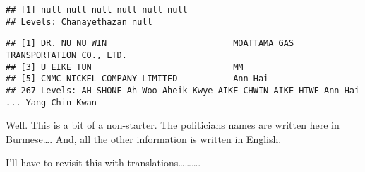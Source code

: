 \documentclass[
]{article}
\newenvironment{Shaded}{\begin{snugshade}}{\end{snugshade}}
\newcommand{\DecValTok}[1]{\textcolor[rgb]{0.00,0.00,0.81}{#1}}
\newcommand{\FunctionTok}[1]{\textcolor[rgb]{0.00,0.00,0.00}{#1}}
\newcommand{\NormalTok}[1]{#1}
\newcommand{\SpecialCharTok}[1]{\textcolor[rgb]{0.00,0.00,0.00}{#1}}
\begin{document}
\begin{Shaded}
\end{Shaded}

\begin{verbatim}
## [1] null null null null null null
## Levels: Chanayethazan null
\end{verbatim}

\begin{Shaded}
\end{Shaded}

\begin{verbatim}
## [1] DR. NU NU WIN                         MOATTAMA GAS TRANSPORTATION CO., LTD.
## [3] U EIKE TUN                            MM                                   
## [5] CNMC NICKEL COMPANY LIMITED           Ann Hai                              
## 267 Levels: AH SHONE Ah Woo Aheik Kwye AIKE CHWIN AIKE HTWE Ann Hai ... Yang Chin Kwan
\end{verbatim}

Well. This is a bit of a non-starter. The politicians names are written
here in Burmese\ldots. And, all the other information is written in
English.

I'll have to revisit this with translations\ldots\ldots\ldots.
\end{document}
